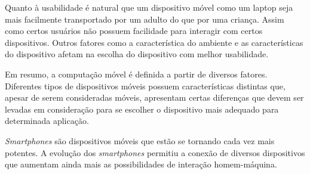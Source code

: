 Quanto à usabilidade é natural que um dispositivo móvel como um laptop seja mais facilmente transportado por um adulto do que por uma criança. Assim como certos usuários não possuem facilidade para interagir com certos dispositivos. Outros fatores como a característica do ambiente e as características do dispositivo afetam na escolha do dispositivo com melhor usabilidade. 

Em resumo, a computação móvel é definida a partir de diversos fatores. Diferentes tipos de dispositivos móveis possuem características distintas que, apesar de serem consideradas móveis, apresentam certas diferenças que devem ser levadas em consideração para se escolher o dispositivo mais adequado para determinada aplicação.

\textit{Smartphones} são dispositivos móveis que estão se tornando cada vez mais potentes. A evolução dos \textit{smartphones} permitiu a conexão de diversos dispositivos que aumentam ainda mais as possibilidades de interação homem-máquina. 

 	